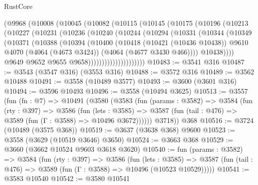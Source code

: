\begin{lexlean}{RustCore}
\begin{coremodule}
            (@9968
              (@10008
                (@10045
                  (@10082
                    (@10115
                      (@10145
                        (@10175
                          (@10196
                            (@10213
                              (@10227
                                (@10231
                                  (@10236
                                    (@10240
                                      (@10244
                                        (@10294
                                          (@10331
                                            (@10344
                                              (@10349
                                                (@10371
                                                  (@10388
                                                    (@10394
                                                      (@10400
                                                        (@10418
                                                          (@10421 (@10436 @10438))
                                                          @9610
                                                          @4070
                                                          (@4064 (@4673 @3424))
                                                          (@4064 (@4677 @3430 @466))))
                                                      @10438))))
                                              @9649
                                              @9652
                                              @9655
                                              @9658)))))))))))))))))))))
@10483 := @3541 @316
@10487 := @3543 (@3547 @316) (@3553 @316)
@10488 := @3572 @316
@10489 := @3562 @10488
@10491 := @3558 (@10489 @3577)
@10493 := @3600 (@3601 @316)
@10494 := @3596 @10493
@10496 := @3558 (@10494 @3625)
@10513 := @3557
    (fun (fn : @7) =>
    @10491
      (@3580
        (@3583
          (fun (params : @3582) =>
          @3584
            (fun (rty : @397) =>
            @3586
              (fun (lets : @3585) =>
              @3587 (fun (tail : @476) => @3589 (fun (Γ : @3588) => @10496 @3672))))))
        @3718))
    @368
@10516 := @3724 (@10489 (@3575 @368))
@10519 := @3637 (@3638 @368) @9600
@10523 := @3558 (@3629 (@10519 @3646) @3650)
@10524 := @3663 @368
@10529 := @3660 (@3662 @10524 @9603 @3618 @3620)
@10540 := fun (params : @3582) =>
  @3584
    (fun (rty : @397) =>
    @3586
      (fun (lets : @3585) =>
      @3587 (fun (tail : @476) => @3589 (fun (Γ : @3588) => @10496 (@10523 @10529)))))
@10541 := @3583 @10540
@10542 := @3580 @10541

\end{coremodule}
\end{lexlean}
